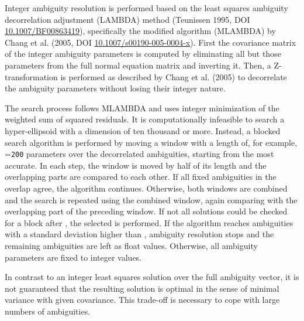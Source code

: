 Integer ambiguity resolution is performed based on the least squares ambiguity decorrelation adjustment
(LAMBDA) method (Teunissen 1995, DOI \href{https://doi.org/10.1007/BF00863419}{10.1007/BF00863419}), specifically
the modified algorithm (MLAMBDA) by Chang et al. (2005, DOI \href{https://doi.org/10.1007/s00190-005-0004-x}{10.1007/s00190-005-0004-x}).
First the covariance matrix of the integer ambiguity parameters is computed by eliminating all but those parameters
from the full normal equation matrix and inverting it. Then, a Z-transformation is performed as described by
Chang et al. (2005) to decorrelate the ambiguity parameters without losing their integer nature.

The search process follows MLAMBDA and uses integer minimization of the weighted sum of squared residuals.
It is computationally infeasible to search a hyper-ellipsoid with a dimension of ten thousand or more.
Instead, a blocked search algorithm is performed by moving a window with a length of, for example,
=\verb|200| parameters over the decorrelated ambiguities, starting from the most accurate.
In each step, the window is moved by half of its length and the overlapping parts are compared to each other.
If all fixed ambiguities in the overlap agree, the algorithm continues.
Otherwise, both windows are combined and the search is repeated using the combined window, again comparing with the overlapping
part of the preceding window. If not all solutions could be checked for a block after ,
the selected  is performed.
If the algorithm reaches ambiguities with a standard deviation higher than ,
ambiguity resolution stops and the remaining ambiguities are left as float values.
Otherwise, all ambiguity parameters are fixed to integer values.

In contrast to an integer least squares solution over the full ambiguity vector, it is not guaranteed that the resulting solution
is optimal in the sense of minimal variance with given covariance.
This trade-off is necessary to cope with large numbers of ambiguities.


